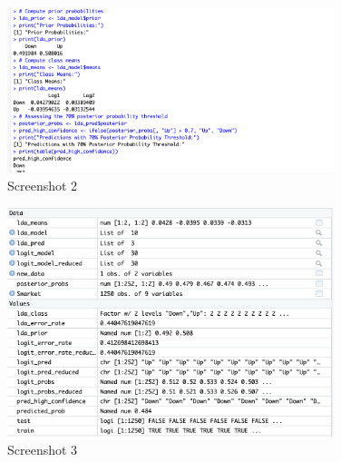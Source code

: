 \documentclass[12pt]{article}
\theoremstyle{definition}
\begin{document}
\begin{figure}[htbp]
    \centering
    \includegraphics[width=0.85\textwidth]{Screenshot_2025-03-02_at_3.56.32_PM.png}
    \caption{Screenshot 2}
    \label{fig:screenshot2}
\end{figure}

\begin{figure}[htbp]
    \centering
    \includegraphics[width=0.85\textwidth]{Screenshot_2025-03-02_at_3.56.51_PM.png}
    \caption{Screenshot 3}
    \label{fig:screenshot3}
\end{figure}
\end{document}
